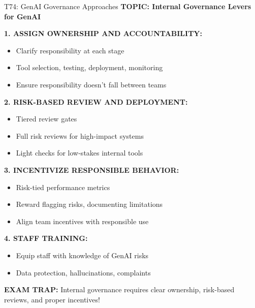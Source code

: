 \documentclass[8pt]{beamer}
\begin{document}
	\begin{frame}{T74: GenAI Governance Approaches}
		\fontsize{6.5}{7.5}\selectfont
		\textbf{TOPIC: Internal Governance Levers for GenAI}
		
		\vspace{0.1cm}
		\textbf{1. ASSIGN OWNERSHIP AND ACCOUNTABILITY:}
		\begin{itemize}
			\item Clarify responsibility at each stage
			\item Tool selection, testing, deployment, monitoring
			\item Ensure responsibility doesn't fall between teams
		\end{itemize}
		
		\vspace{0.1cm}
		\textbf{2. RISK-BASED REVIEW AND DEPLOYMENT:}
		\begin{itemize}
			\item Tiered review gates
			\item Full risk reviews for high-impact systems
			\item Light checks for low-stakes internal tools
		\end{itemize}
		
		\vspace{0.1cm}
		\textbf{3. INCENTIVIZE RESPONSIBLE BEHAVIOR:}
		\begin{itemize}
			\item Risk-tied performance metrics
			\item Reward flagging risks, documenting limitations
			\item Align team incentives with responsible use
		\end{itemize}
		
		\vspace{0.1cm}
		\textbf{4. STAFF TRAINING:}
		\begin{itemize}
			\item Equip staff with knowledge of GenAI risks
			\item Data protection, hallucinations, complaints
		\end{itemize}
		
		\textcolor{myred}{\textbf{EXAM TRAP:}} Internal governance requires \textcolor{myblue}{clear ownership, risk-based reviews, and proper incentives}!
	\end{frame}
	
\end{document}
